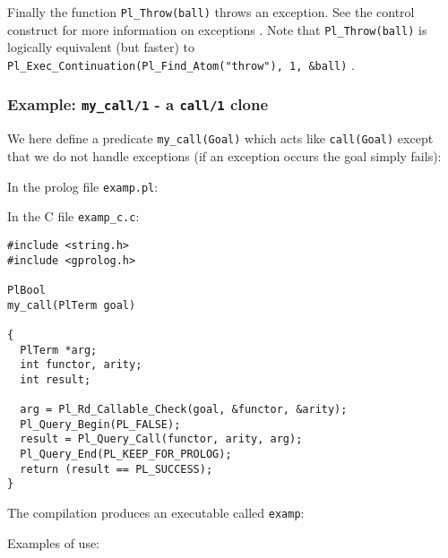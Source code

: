Finally the function \texttt{Pl\_Throw(ball)} throws an exception. See the
 control construct for more information on exceptions
. Note that \texttt{Pl\_Throw(ball)} is logically equivalent (but
faster)
to \texttt{Pl\_Exec\_Continuation(Pl\_Find\_Atom("throw"), 1, \&ball)} .

\subsubsection{Example: \texttt{my\_call/1} - a \texttt{call/1} clone}

We here define a predicate \texttt{my\_call(Goal)} which acts like
\texttt{call(Goal)} except that we do not handle exceptions (if an exception
occurs the goal simply fails):

In the prolog file \texttt{examp.pl}:


In the C file \texttt{examp\_c.c}:

\begin{Indentation}
\begin{verbatim}
#include <string.h>
#include <gprolog.h>

PlBool
my_call(PlTerm goal)

{
  PlTerm *arg;
  int functor, arity;
  int result;

  arg = Pl_Rd_Callable_Check(goal, &functor, &arity);
  Pl_Query_Begin(PL_FALSE);
  result = Pl_Query_Call(functor, arity, arg);
  Pl_Query_End(PL_KEEP_FOR_PROLOG);
  return (result == PL_SUCCESS);
}
\end{verbatim}
\end{Indentation}

The compilation produces an executable called \texttt{examp}:


Examples of use:

\begin{CodeTwoCols}
\SkipLine
{}
\SkipLine
{}
\SkipLine
{}
\SkipLine
{}
\SkipLine
{}
\SkipLine
{}
\SkipLine
{}
\end{CodeTwoCols}

